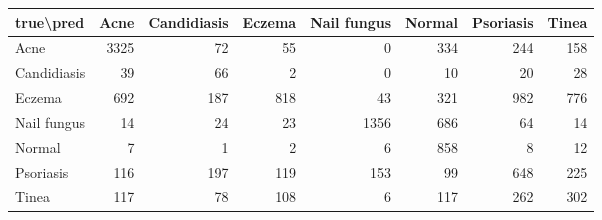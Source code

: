\begin{tabular}{lrrrrrrr}
\toprule
true\textbackslash pred & Acne & Candidiasis & Eczema & Nail fungus & Normal & Psoriasis & Tinea \\
\midrule
Acne & 3325 & 72 & 55 & 0 & 334 & 244 & 158 \\
Candidiasis & 39 & 66 & 2 & 0 & 10 & 20 & 28 \\
Eczema & 692 & 187 & 818 & 43 & 321 & 982 & 776 \\
Nail fungus & 14 & 24 & 23 & 1356 & 686 & 64 & 14 \\
Normal & 7 & 1 & 2 & 6 & 858 & 8 & 12 \\
Psoriasis & 116 & 197 & 119 & 153 & 99 & 648 & 225 \\
Tinea & 117 & 78 & 108 & 6 & 117 & 262 & 302 \\
\bottomrule
\end{tabular}
